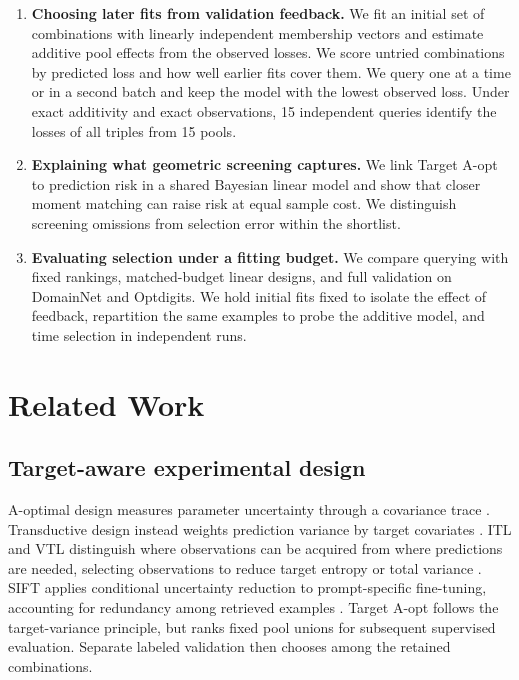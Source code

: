 \begin{enumerate}
\item \textbf{Choosing later fits from validation feedback.} We fit an initial set of combinations with linearly independent membership vectors and estimate additive pool effects from the observed losses. We score untried combinations by predicted loss and how well earlier fits cover them. We query one at a time or in a second batch and keep the model with the lowest observed loss. Under exact additivity and exact observations, 15 independent queries identify the losses of all triples from 15 pools.

\item \textbf{Explaining what geometric screening captures.} We link Target A-opt to prediction risk in a shared Bayesian linear model and show that closer moment matching can raise risk at equal sample cost. We distinguish screening omissions from selection error within the shortlist.

\item \textbf{Evaluating selection under a fitting budget.} We compare querying with fixed rankings, matched-budget linear designs, and full validation on DomainNet and Optdigits. We hold initial fits fixed to isolate the effect of feedback, repartition the same examples to probe the additive model, and time selection in independent runs.
\end{enumerate}

\section{Related Work}
\label{sec:related}
\subsection{Target-aware experimental design}
A-optimal design measures parameter uncertainty through a covariance trace \citep{fontaine2021}. Transductive design instead weights prediction variance by target covariates \citep{yu2006}. ITL and VTL distinguish where observations can be acquired from where predictions are needed, selecting observations to reduce target entropy or total variance \citep{hubotter2024transductive}. SIFT applies conditional uncertainty reduction to prompt-specific fine-tuning, accounting for redundancy among retrieved examples \citep{hubotter2025sift}. Target A-opt follows the target-variance principle, but ranks fixed pool unions for subsequent supervised evaluation. Separate labeled validation then chooses among the retained combinations.

